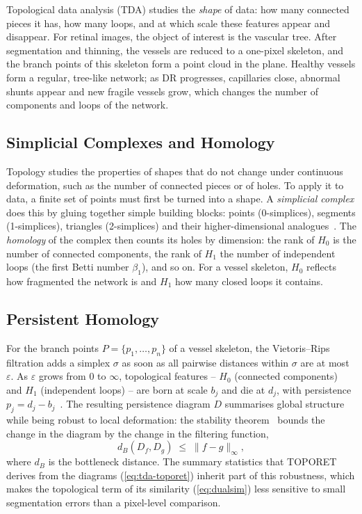 Topological data analysis (TDA) studies the \emph{shape} of data: how many connected
pieces it has, how many loops, and at which scale these features appear and disappear.
For retinal images, the object of interest is the vascular tree. After segmentation and
thinning, the vessels are reduced to a one-pixel skeleton, and the branch points of this
skeleton form a point cloud in the plane. Healthy vessels form a regular, tree-like
network; as DR progresses, capillaries close, abnormal shunts appear and new fragile vessels
grow, which changes the number of components and loops of the network.

\subsection{Simplicial Complexes and Homology}

Topology studies the properties of shapes that do not change under continuous
deformation, such as the number of connected pieces or of holes. To apply it to data, a
finite set of points must first be turned into a shape. A \emph{simplicial complex} does
this by gluing together simple building blocks: points (0-simplices), segments
(1-simplices), triangles (2-simplices) and their higher-dimensional
analogues~\cite{edelsbrunner2010computational}. The \emph{homology} of the complex then
counts its holes by dimension: the rank of $H_0$ is the number of connected components,
the rank of $H_1$ the number of independent loops (the first Betti number $\beta_1$), and
so on. For a vessel skeleton, $H_0$ reflects how fragmented the network is and $H_1$ how
many closed loops it contains.

\subsection{Persistent Homology}

For the branch points $P=\{p_1,\ldots,p_n\}$ of a vessel skeleton, the Vietoris--Rips
filtration adds a simplex $\sigma$ as soon as all pairwise distances within $\sigma$ are
at most $\varepsilon$. As $\varepsilon$ grows from $0$ to $\infty$, topological
features -- $H_0$ (connected components) and $H_1$ (independent loops) -- are born at scale
$b_j$ and die at $d_j$, with persistence $p_j=d_j-b_j$~\cite{edelsbrunner2002persistence,
carlsson2009topology}. The resulting persistence diagram $D$ summarises global structure
while being robust to local deformation: the stability
theorem~\cite{cohensteiner2007stability} bounds the change in the diagram by the change
in the filtering function,
\begin{equation}
d_B(D_f, D_g) \;\leq\; \lVert f-g\rVert_\infty ,
\label{eq:stability}
\end{equation}
where $d_B$ is the bottleneck distance. The summary statistics that TOPORET derives from
the diagrams (\cref{eq:tda-toporet}) inherit part of this robustness, which makes the
topological term of its similarity (\cref{eq:dualsim}) less sensitive to small
segmentation errors than a pixel-level comparison.

